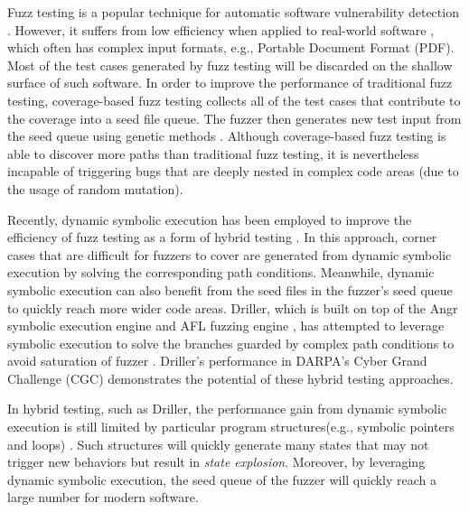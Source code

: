

Fuzz testing is a popular technique for automatic software
vulnerability detection \cite{Miller:Fuzz, 5010257, sutton2007fuzzing}.
However, it suffers from low efficiency when applied to real-world
software \cite{neystadt2008automated, godefroid2008automating,
ganesh2009taint, cadar2011symbolic, rawat2017vuzzer,
stephens2016driller}, which often has complex input formats, e.g.,
Portable Document Format (PDF). Most of the test cases generated by
fuzz testing will be discarded on the shallow surface of such software.
In order to improve the performance of traditional fuzz testing,
coverage-based fuzz testing collects all of the test cases that
contribute to the coverage into a seed file queue. The fuzzer then
generates new test input from the seed queue using genetic methods
\cite{rawat2017vuzzer, online:afl, stephens2016driller}. Although
coverage-based fuzz testing is able to discover more paths than
traditional fuzz testing, it is nevertheless incapable of triggering
bugs that are deeply nested in complex code areas (due to the usage of
random mutation).

Recently, dynamic symbolic execution has been employed to improve the
efficiency of fuzz testing as a form of hybrid testing
\cite{godefroid2012sage, yeh2015craxfuzz, majumdar2007hybrid,
pak2012hybrid}. In this approach, corner cases that are difficult for
fuzzers to cover are generated from dynamic symbolic execution by
solving the corresponding path conditions. Meanwhile, dynamic symbolic
execution can also benefit from the seed files in the fuzzer's seed
queue to quickly reach more wider code areas. Driller, which is built
on top of the Angr symbolic execution engine
\cite{Shoshitaishvili_firmalice-automatic} and AFL fuzzing engine
\cite{online:afl}, has attempted to leverage symbolic execution to
solve the branches guarded by complex path conditions to avoid
saturation of fuzzer \cite{stephens2016driller}. Driller's performance
in DARPA's Cyber Grand Challenge (CGC) \cite{online:CGC} demonstrates
the potential of these hybrid testing approaches.


In hybrid testing, such as Driller, the performance gain from dynamic
symbolic execution is still limited by particular program
structures(e.g., symbolic pointers and loops) \cite{schwartz2010all,
Boonstoppel:RAP, cadar2011symbolic, baldoni2016survey}. Such structures
will quickly generate many states that may not trigger new behaviors
but result in \textit{state explosion}. Moreover, by leveraging dynamic
symbolic execution, the seed queue of the fuzzer will quickly reach a
large number for modern software.

